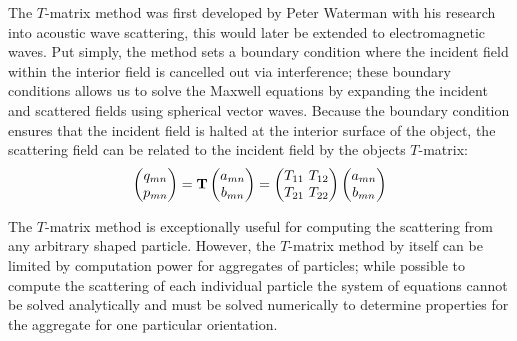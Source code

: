 The $T$-matrix method was first developed by Peter Waterman with his
research into acoustic wave scattering, this would later be extended
to electromagnetic waves. Put simply, the method sets a boundary
condition where the incident field within the interior field is
cancelled out via interference; these boundary conditions allows us to
solve the Maxwell equations by expanding the incident and scattered
fields using spherical vector waves. Because the boundary condition
ensures that the incident field is halted at the interior surface of
the object, the scattering field can be related to the incident field
by the objects $T$-matrix:
\begin{align}
	\begin{pmatrix}
		q_{mn} \\
		p_{mn} 
	\end{pmatrix}
	= \bold{T} 
	\begin{pmatrix}
		a_{mn} \\
		b_{mn}
	\end{pmatrix}
	= \begin{pmatrix}
		T_{11} \ T_{12} \\
		T_{21} \ T_{22}
	\end{pmatrix}
	\begin{pmatrix}
		a_{mn} \\
		b_{mn}
	\end{pmatrix}
\end{align}

The $T$-matrix method is exceptionally useful for computing the
scattering from any arbitrary shaped particle.  However, the
$T$-matrix method by itself can be limited by computation power for
aggregates of particles; while possible to compute the scattering of
each individual particle the system of equations cannot be solved
analytically and must be solved numerically to determine properties
for the aggregate for one particular orientation.






